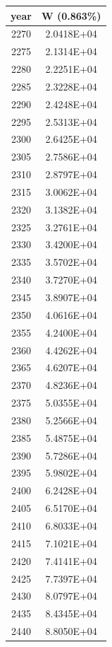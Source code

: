 \documentclass[a4paper]{article}
\begin{document}
	\begin{tabular}{|c|c|}
		\hline
		year & W (0.863\%) \\
		\hline
		2270 & 2.0418E+04 \\
		\hline
		2275 & 2.1314E+04 \\
		\hline
		2280 & 2.2251E+04 \\
		\hline
		2285 & 2.3228E+04 \\
		\hline
		2290 & 2.4248E+04 \\
		\hline
		2295 & 2.5313E+04 \\
		\hline
		2300 & 2.6425E+04 \\
		\hline
		2305 & 2.7586E+04 \\
		\hline
		2310 & 2.8797E+04 \\
		\hline
		2315 & 3.0062E+04 \\
		\hline
		2320 & 3.1382E+04 \\
		\hline
		2325 & 3.2761E+04 \\
		\hline
		2330 & 3.4200E+04 \\
		\hline
		2335 & 3.5702E+04 \\
		\hline
		2340 & 3.7270E+04 \\
		\hline
		2345 & 3.8907E+04 \\
		\hline
		2350 & 4.0616E+04 \\
		\hline
		2355 & 4.2400E+04 \\
		\hline
		2360 & 4.4262E+04 \\
		\hline
		2365 & 4.6207E+04 \\
		\hline
		2370 & 4.8236E+04 \\
		\hline
		2375 & 5.0355E+04 \\
		\hline
		2380 & 5.2566E+04 \\
		\hline
		2385 & 5.4875E+04 \\
		\hline
		2390 & 5.7286E+04 \\
		\hline
		2395 & 5.9802E+04 \\
		\hline
		2400 & 6.2428E+04 \\
		\hline
		2405 & 6.5170E+04 \\
		\hline
		2410 & 6.8033E+04 \\
		\hline
		2415 & 7.1021E+04 \\
		\hline
		2420 & 7.4141E+04 \\
		\hline
		2425 & 7.7397E+04 \\
		\hline
		2430 & 8.0797E+04 \\
		\hline
		2435 & 8.4345E+04 \\
		\hline
		2440 & 8.8050E+04 \\

\end{tabular}
\end{document}
